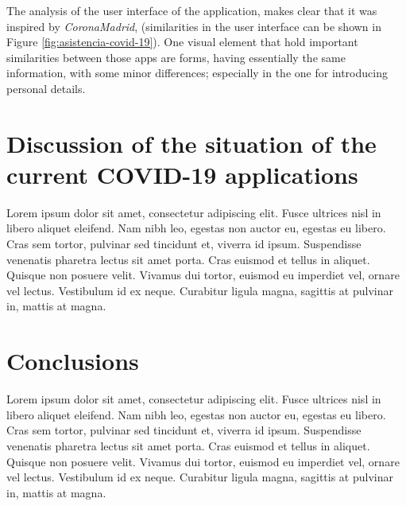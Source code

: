 \documentclass[a4paper, 12pt]{article}
\begin{document}
The analysis of the user interface of the application, makes clear that it was inspired by \textit{CoronaMadrid}, (similarities in the user interface can be shown in Figure \ref{fig:asistencia-covid-19}). One visual element that hold important similarities between those apps are forms, having essentially the same information, with some minor differences; especially in the one for introducing personal details.


\section{Discussion of the situation of the current COVID-19 applications}
\label{section:discussion}

Lorem ipsum dolor sit amet, consectetur adipiscing elit. Fusce ultrices nisl in libero aliquet eleifend. Nam nibh leo, egestas non auctor eu, egestas eu libero. Cras sem tortor, pulvinar sed tincidunt et, viverra id ipsum. Suspendisse venenatis pharetra lectus sit amet porta. Cras euismod et tellus in aliquet. Quisque non posuere velit. Vivamus dui tortor, euismod eu imperdiet vel, ornare vel lectus. Vestibulum id ex neque. Curabitur ligula magna, sagittis at pulvinar in, mattis at magna.


\section{Conclusions}
\label{section:conclusions}

Lorem ipsum dolor sit amet, consectetur adipiscing elit. Fusce ultrices nisl in libero aliquet eleifend. Nam nibh leo, egestas non auctor eu, egestas eu libero. Cras sem tortor, pulvinar sed tincidunt et, viverra id ipsum. Suspendisse venenatis pharetra lectus sit amet porta. Cras euismod et tellus in aliquet. Quisque non posuere velit. Vivamus dui tortor, euismod eu imperdiet vel, ornare vel lectus. Vestibulum id ex neque. Curabitur ligula magna, sagittis at pulvinar in, mattis at magna.





\nocite{*}
\end{document}
